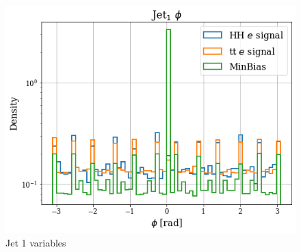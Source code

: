 \documentclass[../main.tex]{subfiles}
\begin{document}
\begin{figure}[!ht]
\begin{minipage}[b]{0.33\linewidth}
    \centering
    \includegraphics[width=1\linewidth]{Chapters/Plots/Hist_1ele_jet1_Phi.png}
  \end{minipage}
  \caption{Jet 1 variables}
 \end{figure}
 
\end{document}
